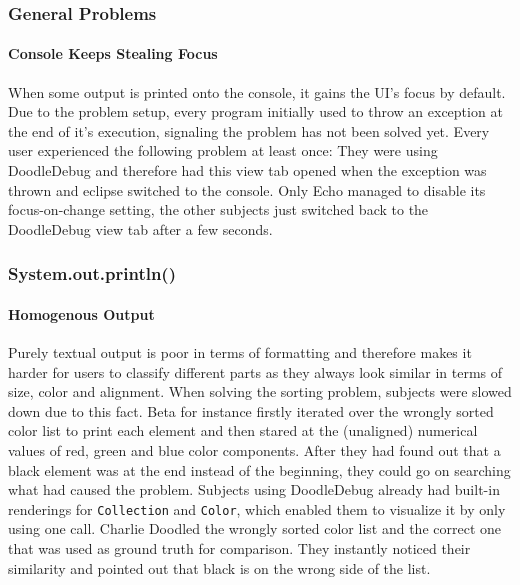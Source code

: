 \documentclass[english]{acm_proc_article-sp}
\begin{document}
\subsubsection{General Problems}
\paragraph{Console Keeps Stealing Focus}
\label{console-focus-problem}
When some output is printed onto the console, it gains the UI's focus by default. Due to the problem setup, every program initially used to throw an exception at the end of it's execution, signaling the problem has not been solved yet. Every user experienced the following problem at least once: They were using DoodleDebug and therefore had this view tab opened when the exception was thrown and eclipse switched to the console. Only Echo managed to disable its focus-on-change setting, the other subjects just switched back to the DoodleDebug view tab after a few seconds.

\subsubsection{System.out.println()}
\paragraph{Homogenous Output}
Purely textual output is poor in terms of formatting and therefore makes it harder for users to classify different parts as they always look similar in terms of size, color and alignment. When solving the sorting problem, subjects were slowed down due to this fact. Beta for instance firstly iterated over the wrongly sorted color list to print each element and then stared at the (unaligned) numerical values of red, green and blue color components. After they had found out that a black element was at the end instead of the beginning, they could go on searching what had caused the problem. Subjects using DoodleDebug already had built-in renderings for \verb.Collection. and \verb.Color., which enabled them to visualize it by only using one call. Charlie Doodled the wrongly sorted color list and the correct one that was used as ground truth for comparison. They instantly noticed their similarity and pointed out that black is on the wrong side of the list.
\end{document}
